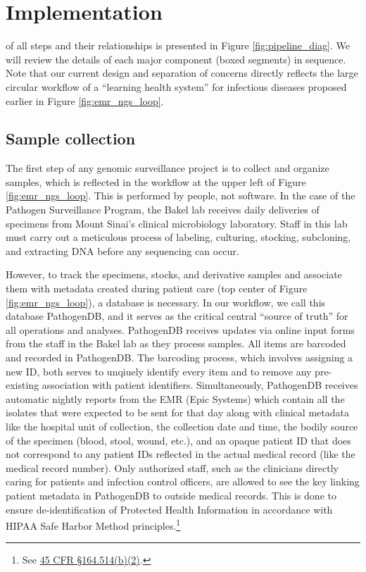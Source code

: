 \section{Implementation}

 of all steps and their relationships is presented in Figure \ref{fig:pipeline_diag}. We will review the details of each major component (boxed segments) in sequence. Note that our current design and separation of concerns directly reflects the large circular workflow of a ``learning health system'' for infectious diseases proposed earlier in Figure \ref{fig:emr_ngs_loop}.

\subsection{Sample collection}

The first step of any genomic surveillance project is to collect and organize samples, which is reflected in the workflow at the upper left of Figure \ref{fig:emr_ngs_loop}. This is performed by people, not software. In the case of the Pathogen Surveillance Program, the Bakel lab receives daily deliveries of specimens from Mount Sinai's clinical microbiology laboratory. Staff in this lab must carry out a meticulous process of labeling, culturing, stocking, subcloning, and extracting DNA before any sequencing can occur.

However, to track the specimens, stocks, and derivative samples and associate them with metadata created during patient care (top center of Figure \ref{fig:emr_ngs_loop}), a database is necessary. In our workflow, we call this database PathogenDB, and it serves as the critical central ``source of truth'' for all operations and analyses. PathogenDB receives updates via online input forms from the staff in the Bakel lab as they process samples. All items are barcoded and recorded in PathogenDB. The barcoding process, which involves assigning a new ID, both serves to unqiuely identify every item and to remove any pre-existing association with patient identifiers. Simultaneously, PathogenDB receives automatic nightly reports from the EMR (Epic Systems) which contain all the isolates that were expected to be sent for that day along with clinical metadata like the hospital unit of collection, the collection date and time, the bodily source of the specimen (blood, stool, wound, etc.), and an opaque patient ID that does not correspond to any patient IDs reflected in the actual medical record (like the medical record number). Only authorized staff, such as the clinicians directly caring for patients and infection control officers, are allowed to see the key linking patient metadata in PathogenDB to outside medical records. This is done to ensure de-identification of Protected Health Information in accordance with HIPAA Safe Harbor Method principles.\footnote{See \href{https://www.law.cornell.edu/cfr/text/45/164.514}{45 CFR §164.514(b)(2)}.}

